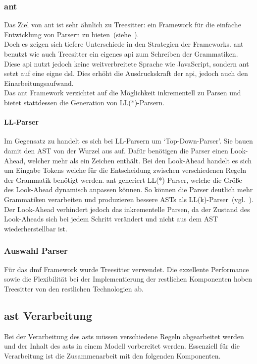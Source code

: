 \documentclass[./einleitung.tex]{subfiles}
\begin{document}
\subsubsection{\acrfull{ant}}
Das Ziel von \acrshort{ant} ist sehr ähnlich zu Treesitter: ein Framework für die einfache Entwicklung von Parsern zu bieten~(siehe~\cite{antlrWebsite}). \\
Doch es zeigen sich tiefere Unterschiede in den Strategien der Frameworks.
\acrshort{ant} benutzt wie auch Treesitter ein eigenes \acrfull{api} zum Schreiben der Grammatiken.
Diese \acrshort{api} nutzt jedoch keine weitverbreitete Sprache wie JavaScript, sondern \acrshort{ant} setzt auf eine eigne \acrfull{dsl}.
Dies erhöht die Ausdruckskraft der \acrshort{api}, jedoch auch den Einarbeitungsaufwand.\\
Das \acrshort{ant} Framework verzichtet auf die Möglichkeit inkrementell zu Parsen und bietet stattdessen die Generation von LL(*)-Parsern.

\paragraph{LL-Parser} Im Gegensatz zu  handelt es sich bei LL-Parsern um `Top-Down-Parser'.
Sie bauen damit den AST von der Wurzel aus auf.
Dafür benötigen die Parser einen Look-Ahead, welcher mehr als ein Zeichen enthält.
Bei den Look-Ahead handelt es sich um Eingabe Tokens welche für die Entscheidung zwischen verschiedenen Regeln der Grammatik benötigt werden.
\acrshort{ant} generiert LL(*)-Parser, welche die Größe des Look-Ahead dynamisch anpassen können.
So können die Parser deutlich mehr Grammatiken verarbeiten und produzieren bessere ASTs als LL(k)-Parser~(vgl.~\cite{parr2011ll}).
Der Look-Ahead verhindert jedoch das inkrementelle Parsen, da der Zustand des Look-Aheads sich bei jedem Schritt verändert und nicht aus dem AST wiederherstellbar ist.

\subsubsection{Auswahl Parser}
Für das \acrshort{dmf} Framework wurde Treesitter verwendet.
Die exzellente Performance sowie die Flexibilität bei der Implementierung der restlichen Komponenten hoben Treesitter von den restlichen Technologien ab.


\subsection{\acrshort{ast} Verarbeitung}
Bei der Verarbeitung des \acrshort{ast}s müssen verschiedene Regeln abgearbeitet werden und der Inhalt des \acrshort{ast}s in einem Modell vorbereitet werden.
Essenziell für die Verarbeitung ist die Zusammenarbeit mit den folgenden Komponenten.
\end{document}
